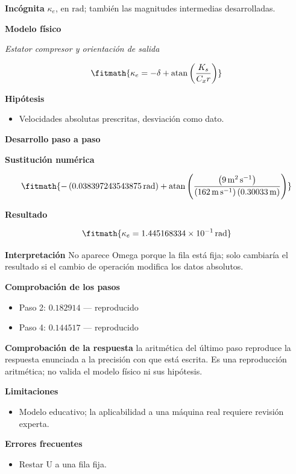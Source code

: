 \documentclass[10pt,openany]{book}
\begin{document}
\noindent\textbf{Incógnita}
$\kappa_e$, en $\mathrm{rad}$; también las magnitudes intermedias desarrolladas.

\noindent\textbf{Modelo físico}

\noindent\textit{Estator compresor y orientación de salida}

\[
\fitmath{\kappa_e=- \delta + \operatorname{atan}{\left(\frac{K_s}{C_x r} \right)}}
\]

\noindent\textbf{Hipótesis}
\begin{itemize}
\item Velocidades absolutas prescritas, desviación como dato.
\end{itemize}

\noindent\textbf{Desarrollo paso a paso}



\noindent\textbf{Sustitución numérica}

\[
\fitmath{- \left(0.038397243543875\,\mathrm{rad}\right) + \operatorname{atan}{\left(\frac{\left(9\,\mathrm{m}^{2}\,\mathrm{s}^{-1}\right)}{\left(162\,\mathrm{m}\,\mathrm{s}^{-1}\right) \left(0.30033\,\mathrm{m}\right)} \right)}}
\]

\noindent\textbf{Resultado}

\[
\fitmath{\kappa_e=1.445168334\times10^{-1}\,\mathrm{rad}}
\]

\noindent\textbf{Interpretación}
No aparece Omega porque la fila está fija; solo cambiaría el resultado si el cambio de operación modifica los datos absolutos.

\noindent\textbf{Comprobación de los pasos}
\begin{itemize}
\item Paso 2: $0.182914$ — reproducido
\item Paso 4: $0.144517$ — reproducido
\end{itemize}

\noindent\textbf{Comprobación de la respuesta} la aritmética del último paso reproduce la respuesta enunciada a la precisión con que está escrita. Es una reproducción aritmética; no valida el modelo físico ni sus hipótesis.

\noindent\textbf{Limitaciones}
\begin{itemize}
\item Modelo educativo; la aplicabilidad a una máquina real requiere revisión experta.
\end{itemize}

\noindent\textbf{Errores frecuentes}
\begin{itemize}
\item Restar U a una fila fija.
\end{itemize}
\end{document}

